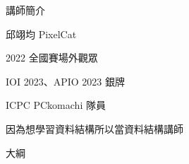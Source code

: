 \begin{frame}
    \titlepage
\end{frame}

\begin{frame}{講師簡介}
    \begin{itemize}
        \item 邱翊均 PixelCat
        \item 2022 全國賽場外觀眾
        \item IOI 2023、APIO 2023 銀牌
        \item ICPC PCkomachi 隊員
         {
            \item 因為想學習資料結構所以當資料結構講師
        }
    \end{itemize}
\end{frame}

\begin{frame}{大綱}
    \tableofcontents
\end{frame}
